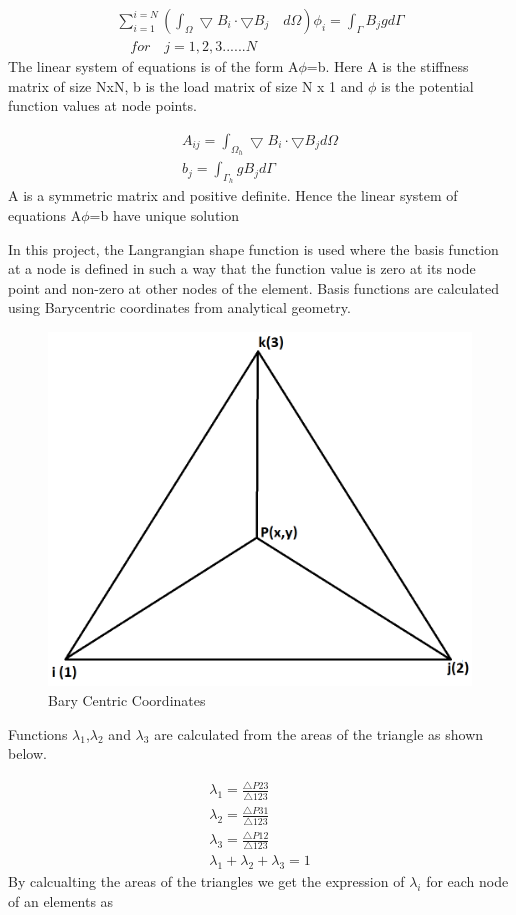 \documentclass[12pt]{elsarticle}
\begin{document}
	\begin{equation}
		\begin{gathered}
			\sum\limits_{i=1}^{i=N} \left(\int_{{\Omega}} \bigtriangledown B_i \cdot \bigtriangledown B_j \quad d \Omega \right) \phi_i =\int_{\Gamma} B_j g d \Gamma \\ \quad for\quad  j=1,2,3......N
		\end{gathered}
	\end{equation}
	The linear system of equations is of the form A$\phi$=b. Here A is the stiffness matrix of size NxN, b is the load matrix of size N x 1 and $\phi$ is the potential function values at node points. 
	
	\begin{equation}
		\begin{gathered}
			A_{ij}= \int_{\Omega_h} \bigtriangledown B_i \cdot \bigtriangledown B_j d \Omega\\
			b_j= \int_{\Gamma_h} g B_j d \Gamma
		\end{gathered}
	\end{equation}
	A is a symmetric matrix and positive definite. Hence the linear system of equations A$\phi$=b have unique solution
	
	In this project, the Langrangian shape function is used where the basis function at a node is defined in such a way that the function value is zero at its node point and non-zero at other nodes of the element. Basis functions are calculated using Barycentric coordinates from analytical geometry.
	
	\begin{figure}[h]
		\centering\includegraphics[width=0.5\linewidth]{figure_1.png}
		\caption{Bary Centric Coordinates}
	\end{figure}
	
	Functions $\lambda_1$,$\lambda_2$ and $\lambda_3$ are calculated from the areas of the triangle as shown below.
	
	\begin{equation}
		\begin{gathered}
			\lambda_1=\frac{\bigtriangleup P23}{\bigtriangleup123}\\
			\lambda_2=\frac{\bigtriangleup P31}{\bigtriangleup123}\\
			\lambda_3=\frac{\bigtriangleup P12}{\bigtriangleup123}\\
			\lambda_1+\lambda_2+\lambda_3=1
		\end{gathered}
	\end{equation}
	By calcualting the areas of the triangles we get the expression of $\lambda_i$ for each node of an elements as
	
\end{document}
